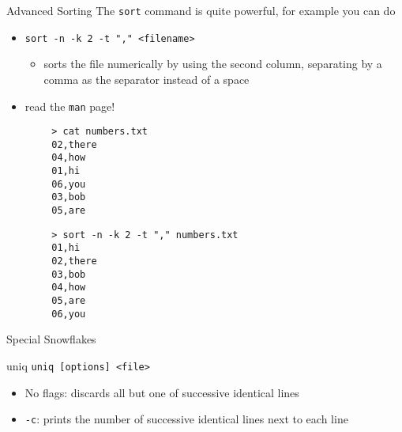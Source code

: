 \documentclass[11pt]{beamer}
\newcommand{\colbf}[1]{\textcolor{mLightBrown!77!black}{#1}}%
\begin{document}
\begin{frame}[fragile]{Advanced Sorting}
  The \texttt{sort} command is quite powerful, for example you can do
  \begin{itemize}
    \item \texttt{sort -n -k 2 -t "," <filename>}
    \begin{itemize}
      \item sorts the file numerically by using the second column, separating by a comma as the separator instead
            of a space
    \end{itemize}
    \item read the \texttt{man} page!
  \end{itemize}
  \vspace*{-2ex}
  \begin{minipage}[t]{\textwidth}
    \begin{minipage}[t]{.48\textwidth}
      \begin{verbatim}
        > cat numbers.txt
        02,there
        04,how
        01,hi
        06,you
        03,bob
        05,are
      \end{verbatim}
    \end{minipage}
    \hfill
    \begin{minipage}[t]{.48\textwidth}
      \begin{verbatim}
        > sort -n -k 2 -t "," numbers.txt
        01,hi
        02,there
        03,bob
        04,how
        05,are
        06,you
      \end{verbatim}
    \end{minipage}
  \end{minipage}
\end{frame}

\begin{frame}[fragile]{Special Snowflakes}
  \begin{block}{\colbf{uniq}}
    \texttt{uniq [options] <file>}
    \begin{itemize}
      \item No flags: discards all but one of successive identical lines
      \item \texttt{-c}: prints the number of successive identical lines next to each line
    \end{itemize}
  \end{block}
\end{frame}
\end{document}
